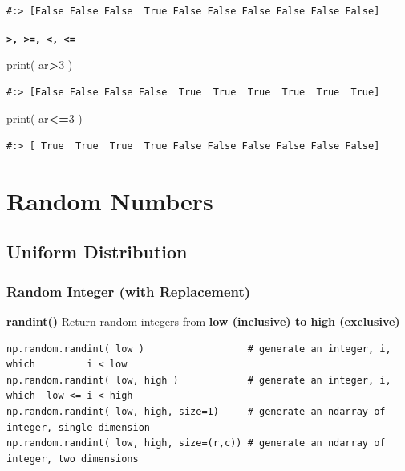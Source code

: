 \documentclass[
]{book}
\newenvironment{Shaded}{\begin{snugshade}}{\end{snugshade}}
\newcommand{\BuiltInTok}[1]{#1}
\newcommand{\DecValTok}[1]{\textcolor[rgb]{0.06,0.06,0.06}{#1}}
\newcommand{\NormalTok}[1]{#1}
\newcommand{\OperatorTok}[1]{\textcolor[rgb]{0.43,0.43,0.43}{\textbf{#1}}}
\begin{document}
\begin{verbatim}
#:> [False False False  True False False False False False False]
\end{verbatim}

\textbf{\texttt{\textgreater{},\ \textgreater{}=,\ \textless{},\ \textless{}=}}

\begin{Shaded}
\begin{Highlighting}[]
\BuiltInTok{print}\NormalTok{( ar}\OperatorTok{>}\DecValTok{3}\NormalTok{ )}
\end{Highlighting}
\end{Shaded}

\begin{verbatim}
#:> [False False False False  True  True  True  True  True  True]
\end{verbatim}

\begin{Shaded}
\begin{Highlighting}[]
\BuiltInTok{print}\NormalTok{( ar}\OperatorTok{<=}\DecValTok{3}\NormalTok{ )}
\end{Highlighting}
\end{Shaded}

\begin{verbatim}
#:> [ True  True  True  True False False False False False False]
\end{verbatim}

\hypertarget{random-numbers}{%
\section{Random Numbers}\label{random-numbers}}

\hypertarget{uniform-distribution}{%
\subsection{Uniform Distribution}\label{uniform-distribution}}

\hypertarget{random-integer-with-replacement}{%
\subsubsection{Random Integer (with Replacement)}\label{random-integer-with-replacement}}

\textbf{randint()} Return random integers from \textbf{low (inclusive) to high (exclusive)}

\begin{verbatim}
np.random.randint( low )                  # generate an integer, i, which         i < low
np.random.randint( low, high )            # generate an integer, i, which  low <= i < high
np.random.randint( low, high, size=1)     # generate an ndarray of integer, single dimension
np.random.randint( low, high, size=(r,c)) # generate an ndarray of integer, two dimensions 
\end{verbatim}
\end{document}
